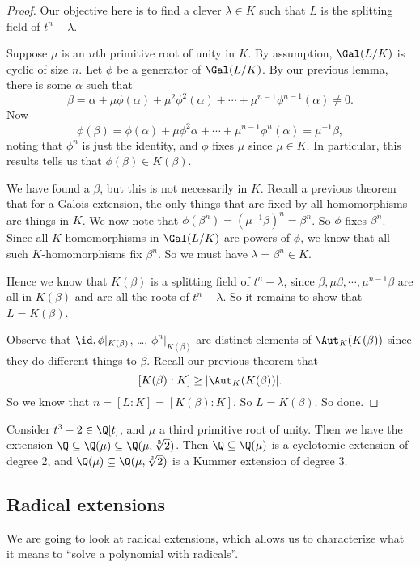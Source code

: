 \documentclass[a4paper]{article}
\begin{document}
\begin{proof}
  Our objective here is to find a clever $\lambda \in K$ such that $L$ is the splitting field of $t^n - \lambda$.

  Suppose $\mu$ is an $n$th primitive root of unity in $K$. By assumption, $\Gal(L/K)$ is cyclic of size $n$. Let $\phi$ be a generator of $\Gal(L/K)$. By our previous lemma, there is some $\alpha$ such that
  \[
    \beta = \alpha + \mu\phi(\alpha) + \mu^2\phi^2(\alpha) + \cdots + \mu^{n - 1}\phi^{n - 1}(\alpha) \not= 0.
  \]
  Now
  \[
    \phi(\beta) = \phi(\alpha) + \mu \phi^2 \alpha + \cdots + \mu^{n - 1} \phi^n (\alpha) = \mu^{-1}\beta,
  \]
  noting that $\phi^n$ is just the identity, and $\phi$ fixes $\mu$ since $\mu \in K$. In particular, this results tells us that $\phi(\beta) \in K(\beta)$.

  We have found a $\beta$, but this is not necessarily in $K$. Recall a previous theorem that for a Galois extension, the only things that are fixed by all homomorphisms are things in $K$. We now note that $\phi(\beta^n) = (\mu^{-1}\beta)^n = \beta^n$. So $\phi$ fixes $\beta^n$. Since all $K$-homomorphisms in $\Gal(L/K)$ are powers of $\phi$, we know that all such $K$-homomorphisms fix $\beta^n$. So we must have $\lambda = \beta^n \in K$.

  Hence we know that $K(\beta)$ is a splitting field of $t^n - \lambda$, since $\beta, \mu\beta, \cdots, \mu^{n - 1}\beta$ are all in $K(\beta)$ and are all the roots of $t^n - \lambda$. So it remains to show that $L = K(\beta)$.

  Observe that $\id, \phi|_{K(\beta)}$, \ldots, $\phi^n|_{K(\beta)}$ are distinct elements of $\Aut_K(K(\beta))$ since they do different things to $\beta$. Recall our previous theorem that
  \[
    [K(\beta):K] \geq |\Aut_K (K(\beta))|.
  \]
  So we know that $n = [L:K] = [K(\beta):K]$. So $L = K(\beta)$. So done.
\end{proof}

\begin{eg}
  Consider $t^3 - 2 \in \Q[t]$, and $\mu$ a third primitive root of unity. Then we have the extension $\Q\subseteq \Q(\mu) \subseteq \Q(\mu, \sqrt[3]{2})$. Then $\Q\subseteq \Q(\mu)$ is a cyclotomic extension of degree $2$, and $\Q(\mu) \subseteq \Q(\mu, \sqrt[3]{2})$ is a Kummer extension of degree 3.
\end{eg}

\subsection{Radical extensions}
We are going to look at radical extensions, which allows us to characterize what it means to ``solve a polynomial with radicals''.
\end{document}
